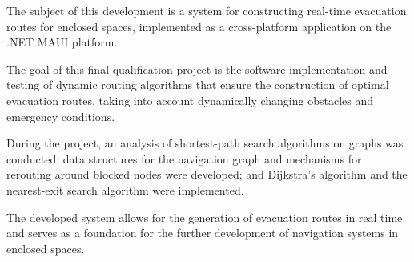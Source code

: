 The subject of this development is a system for constructing real-time evacuation routes for enclosed spaces, implemented as a cross-platform application on the .NET MAUI platform.

The goal of this final qualification project is the software implementation and testing of dynamic routing algorithms that ensure the construction of optimal evacuation routes, taking into account dynamically changing obstacles and emergency conditions.

During the project, an analysis of shortest-path search algorithms on graphs was conducted; data structures for the navigation graph and mechanisms for rerouting around blocked nodes were developed; and Dijkstra’s algorithm and the nearest-exit search algorithm were implemented.

The developed system allows for the generation of evacuation routes in real time and serves as a foundation for the further development of navigation systems in enclosed spaces.
